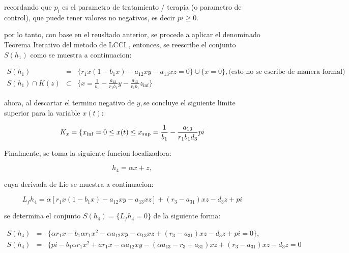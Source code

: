 \documentclass[letterpaper,11pt]{article}
\begin{document}
recordando que $p_{i}$ es el parametro de tratamiento / terapia (o parametro
de control), que puede tener valores no negativos, es decir $pi\geq 0.$

\bigskip

por lo tanto, con base en el reusltado anterior, se procede a aplicar el
denominado Teorema Iterativo del metodo de LCCI , entonces, se reescribe el
conjunto $S\left( h_{1}\right) $ como se muestra a continuacion:

\bigskip

\begin{eqnarray*}
S\left( h_{1}\right) &=&\{r_{1}x\left( 1-b_{1}x\right)
-a_{12}xy-a_{13}xz=0\}\cup \{x=0\},\text{(esto no se escribe de manera
formal)} \\
S\left( h_{1}\right) \cap K\left( z\right) &\subset &\{x=\frac{1}{b_{1}}-%
\frac{a_{12}}{r_{1}b_{1}}y-\frac{a_{13}}{r_{1}b_{1}}z_{\inf }\}
\end{eqnarray*}

\bigskip

ahora, al descartar el termino negativo de $y,$se concluye el siguiente
limite superior para la variable $x\left( t\right) $:

\bigskip

\begin{equation*}
K_{x}=\{x_{\inf }=0\leq x(t)\leq x_{\sup }=\frac{1}{b_{1}}-\frac{a_{13}}{%
r_{1}b_{1}d_{3}}pi
\end{equation*}

\bigskip

Finalmente, se toma la siguiente funcion localizadora:

\begin{equation*}
h_{4}=\alpha x+z,
\end{equation*}

\bigskip

\bigskip cuya derivada de Lie se muestra a continuacion:

\bigskip

\begin{equation*}
L_{f}h_{4}=\alpha \left[ r_{1}x\left( 1-b_{1}x\right) -a_{12}xy-a_{13}xz%
\right] +(r_{3}-a_{31})xz-d_{3}z+pi
\end{equation*}

\bigskip

se determina el conjunto $S\left( h_{4}\right) =\{L_{f}h_{4}=0\}$ de la
siguiente forma:

\begin{eqnarray*}
S\left( h_{4}\right) &=&\{\alpha r_{1}x-b_{1}\alpha r_{1}x^{2}-\alpha
a_{12}xy-\alpha _{13}xz+\left( r_{3}-a_{31}\right) xz-d_{3}z+pi=0\}, \\
S\left( h_{4}\right) &=&\{pi-b_{1}\alpha r_{1}x^{2}+ar_{1}x-\alpha
a_{12}xy-(\alpha a_{13}-r_{3}+a_{31})xz+\left( r_{3}-a_{31}\right)
xz-d_{3}z=0
\end{eqnarray*}
\end{document}
